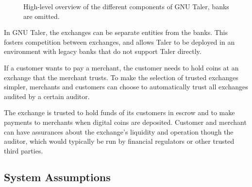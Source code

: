 \begin{figure}
  \begin{center}
  \end{center}
  \caption[High-level overview of GNU Taler components.]{High-level overview of the different components of GNU Taler, banks are omitted.}
  \label{fig:taler-arch}
\end{figure}

In GNU Taler, the exchanges can be separate entities from the banks.  This fosters
competition between exchanges, and allows Taler to be deployed in an
environment with legacy banks that do not support Taler directly.

If a customer wants to pay a merchant, the customer needs to hold coins at an
exchange that the merchant trusts.  To make the selection of trusted exchanges
simpler, merchants and customers can choose to automatically trust all
exchanges audited by a certain auditor.

The exchange is trusted to hold funds of its customers in escrow and to make
payments to merchants when digital coins are deposited.  Customer and merchant
can have assurances about the exchange's liquidity and operation though the
auditor, which would typically be run by financial regulators or other trusted
third parties.

\subsection{System Assumptions}

